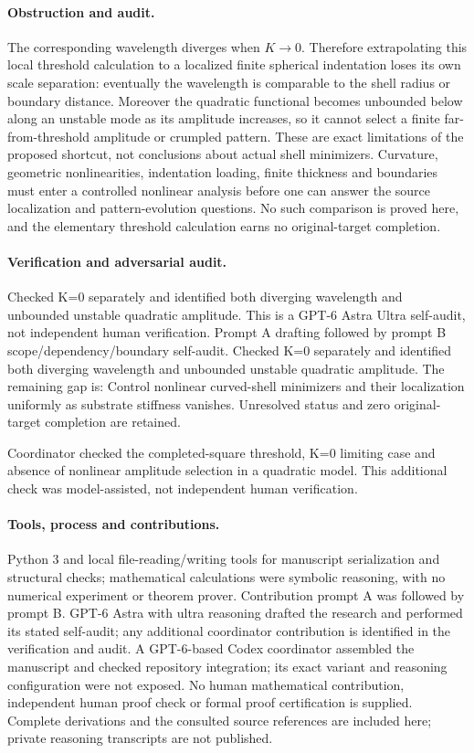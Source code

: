 \documentclass[11pt]{article}
\begin{document}
\paragraph{Obstruction and audit.} The corresponding wavelength diverges when \(K\to0\). Therefore extrapolating this local threshold calculation to a localized finite spherical indentation loses its own scale separation: eventually the wavelength is comparable to the shell radius or boundary distance. Moreover the quadratic functional becomes unbounded below along an unstable mode as its amplitude increases, so it cannot select a finite far-from-threshold amplitude or crumpled pattern. These are exact limitations of the proposed shortcut, not conclusions about actual shell minimizers. Curvature, geometric nonlinearities, indentation loading, finite thickness and boundaries must enter a controlled nonlinear analysis before one can answer the source localization and pattern-evolution questions. No such comparison is proved here, and the elementary threshold calculation earns no original-target completion.

\paragraph{Verification and adversarial audit.}
Checked K=0 separately and identified both diverging wavelength and unbounded unstable quadratic amplitude. This is a GPT-6 Astra Ultra self-audit, not independent human verification. Prompt A drafting followed by prompt B scope/dependency/boundary self-audit. Checked K=0 separately and identified both diverging wavelength and unbounded unstable quadratic amplitude. The remaining gap is: Control nonlinear curved-shell minimizers and their localization uniformly as substrate stiffness vanishes. Unresolved status and zero original-target completion are retained.

Coordinator checked the completed-square threshold, K=0 limiting case and absence of nonlinear amplitude selection in a quadratic model. This additional check was model-assisted, not independent human verification.

\paragraph{Tools, process and contributions.}
Python 3 and local file-reading/writing tools for manuscript serialization and structural checks; mathematical calculations were symbolic reasoning, with no numerical experiment or theorem prover. Contribution prompt A was followed by prompt B. GPT-6 Astra with ultra reasoning drafted the research and performed its stated self-audit; any additional coordinator contribution is identified in the verification and audit. A GPT-6-based Codex coordinator assembled the manuscript and checked repository integration; its exact variant and reasoning configuration were not exposed. No human mathematical contribution, independent human proof check or formal proof certification is supplied. Complete derivations and the consulted source references are included here; private reasoning transcripts are not published.
\end{document}
